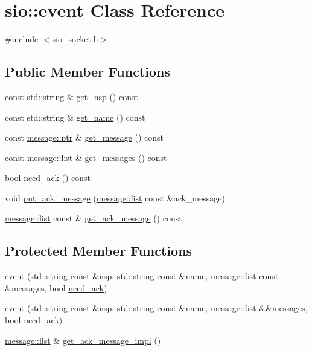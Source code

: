\hypertarget{classsio_1_1event}{}\section{sio\+:\+:event Class Reference}
\label{classsio_1_1event}


{\ttfamily \#include $<$sio\+\_\+socket.\+h$>$}

\subsection*{Public Member Functions}
\begin{DoxyCompactItemize}
\item 
const std\+::string \& \hyperlink{classsio_1_1event_a248d2f8a20d6915059ec8cee5cf7449d}{get\+\_\+nsp} () const
\item 
const std\+::string \& \hyperlink{classsio_1_1event_ac5049d464f6b37a92739bbbaee700f7f}{get\+\_\+name} () const
\item 
const \hyperlink{classsio_1_1message_a6340b6fef57e4516eb17928b1885a615}{message\+::ptr} \& \hyperlink{classsio_1_1event_af72f3e38225ee8768c183d28d717a3da}{get\+\_\+message} () const
\item 
const \hyperlink{classsio_1_1message_1_1list}{message\+::list} \& \hyperlink{classsio_1_1event_aaeab1effd6c5d26a8da946b13c42437d}{get\+\_\+messages} () const
\item 
bool \hyperlink{classsio_1_1event_ac6e186489b8452bbc32cc734b3dc099c}{need\+\_\+ack} () const
\item 
void \hyperlink{classsio_1_1event_a9f7d62c97996e85bdff7de53932a595a}{put\+\_\+ack\+\_\+message} (\hyperlink{classsio_1_1message_1_1list}{message\+::list} const \&ack\+\_\+message)
\item 
\hyperlink{classsio_1_1message_1_1list}{message\+::list} const  \& \hyperlink{classsio_1_1event_a03d343ade27c0cdf35f4e31ea996e7da}{get\+\_\+ack\+\_\+message} () const
\end{DoxyCompactItemize}
\subsection*{Protected Member Functions}
\begin{DoxyCompactItemize}
\item 
\hyperlink{classsio_1_1event_a33a61e908fbc2fec7273db572b77fbd2}{event} (std\+::string const \&nsp, std\+::string const \&name, \hyperlink{classsio_1_1message_1_1list}{message\+::list} const \&messages, bool \hyperlink{classsio_1_1event_ac6e186489b8452bbc32cc734b3dc099c}{need\+\_\+ack})
\item 
\hyperlink{classsio_1_1event_a6f053dd419d8260c4ec28f278504ab19}{event} (std\+::string const \&nsp, std\+::string const \&name, \hyperlink{classsio_1_1message_1_1list}{message\+::list} \&\&messages, bool \hyperlink{classsio_1_1event_ac6e186489b8452bbc32cc734b3dc099c}{need\+\_\+ack})
\item 
\hyperlink{classsio_1_1message_1_1list}{message\+::list} \& \hyperlink{classsio_1_1event_a777c67213b1373320bd759225fe62716}{get\+\_\+ack\+\_\+message\+\_\+impl} ()
\end{DoxyCompactItemize}
